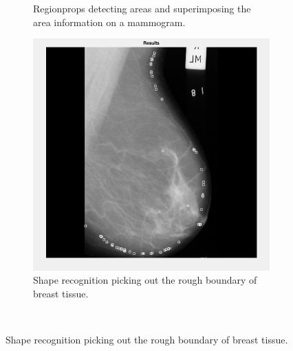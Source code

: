 \begin{figure}[H]
\begin{subfigure}[t]{0.3\textwidth}
        \caption{Regionprops detecting areas and superimposing the area information on a mammogram.}
        \label{fig:regionprops}
    \end{subfigure} \hfill
    \begin{subfigure}[t]{0.3\textwidth}
      \includegraphics[width=\textwidth]{Chapter2/technical-img/shape_recog.png}
      \caption{Shape recognition picking out the rough boundary of breast tissue.}
      \label{fig:shape-recog}
    \end{subfigure}
    ~ %


\end{figure}
